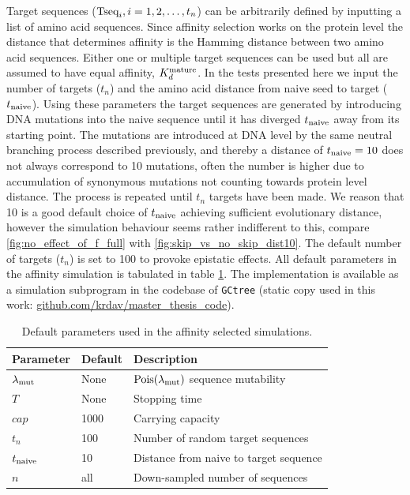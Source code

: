 Target sequences ($\text{Tseq}_i, i=1,2, \hdots, t_n$) can be arbitrarily defined by inputting a list of amino acid sequences.
Since affinity selection works on the protein level the distance that determines affinity is the Hamming distance between two amino acid sequences.
Either one or multiple target sequences can be used but all are assumed to have equal affinity, $K^{\text{mature}}_d$.
In the tests presented here we input the number of targets ($t_n$) and the amino acid distance from naive seed to target ($t_{\text{naive}}$).
Using these parameters the target sequences are generated by introducing DNA mutations into the naive sequence until it has diverged $t_{\text{naive}}$ away from its starting point.
The mutations are introduced at DNA level by the same neutral branching process described previously, and thereby a distance of $t_{\text{naive}}=10$ does not always correspond to 10 mutations, often the number is higher due to accumulation of synonymous mutations not counting towards protein level distance.
The process is repeated until $t_n$ targets have been made.
We reason that 10 is a good default choice of $t_{\text{naive}}$ achieving sufficient evolutionary distance, however the simulation behaviour seems rather indifferent to this, compare \ref{fig:no_effect_of_f_full} with \ref{fig:skip_vs_no_skip_dist10}.
The default number of targets ($t_n$) is set to 100 to provoke epistatic effects.
All default parameters in the affinity simulation is tabulated in table \ref{aff_constants}.
The implementation is available as a simulation subprogram in the codebase of \texttt{GCtree} (static copy used in this work: \url{github.com/krdav/master_thesis_code}).

\begin{table}[ht]
\centering
\begin{tabular}{lll}
Parameter    & Default & Description \\ \hline
$\lambda_{\text{mut}}$ & None & $\operatorname{Pois}(\lambda_{\text{mut}})$ sequence mutability \\
$T$ & None & Stopping time \\
$cap$ & 1000 & Carrying capacity \\
$t_n$ & 100 & Number of random target sequences \\
$t_{\text{naive}}$ & 10 & Distance from naive to target sequence \\
$n$ & all & Down-sampled number of sequences
\end{tabular}
\caption{
\label{aff_constants}
    Default parameters used in the affinity selected simulations.}
\end{table}










